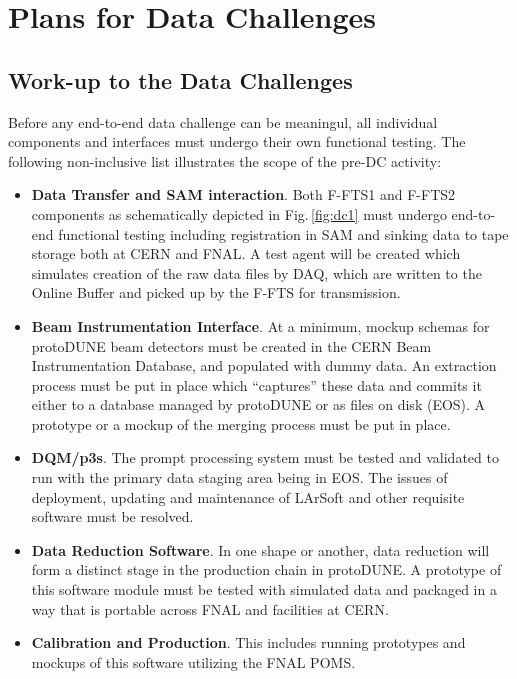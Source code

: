 \documentclass[pdftex,12pt,letter]{article}
\newcommand{\pd}{protoDUNE\xspace}
\begin{document}
\section{Plans for Data Challenges}
\subsection{Work-up to the Data Challenges}
Before any end-to-end data challenge can be meaningul, all individual components and interfaces must undergo
their own functional testing. The following non-inclusive list illustrates the scope of the pre-DC activity:
\begin{itemize}

\item \textbf{Data Transfer and SAM interaction}.  Both F-FTS1 and F-FTS2 components as schematically depicted in Fig.\,\ref{fig:dc1}
must undergo end-to-end functional testing including registration in SAM and sinking data to tape storage both at CERN and FNAL. A test
agent will be created which simulates creation of the raw data files by DAQ, which are written to the Online Buffer and picked up
by the F-FTS for transmission.

\item \textbf{Beam Instrumentation Interface}. At a minimum, mockup schemas for \pd beam detectors must be created in
the CERN Beam Instrumentation Database, and populated with dummy data. An extraction process must be put in place which
``captures'' these data and commits it either to a database managed by \pd or as files on disk (EOS). A prototype or a mockup
of the merging process must be put in place.

\item  \textbf{DQM/p3s}. The prompt processing system must be tested and validated to run with the primary data
staging area being in EOS. The issues of deployment, updating and maintenance of LArSoft and other requisite software
must be resolved.

\item  \textbf{Data Reduction Software}. In one shape or another, data reduction will form a distinct stage in the production chain
in \pd. A prototype of this software module must be tested with simulated data and packaged in a way that is portable across
FNAL and facilities at CERN.

\item  \textbf{Calibration and Production}. This includes running prototypes and mockups of this software utilizing the FNAL POMS.

\end{itemize}
\end{document}
